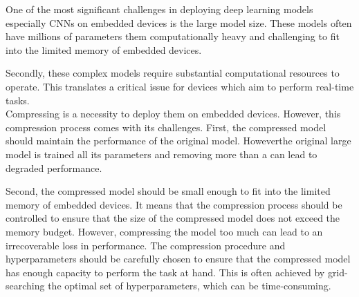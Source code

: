 One of the most significant challenges in deploying deep learning models \DIFdelbegin \DIFdel{,
}\DIFdelend \DIFaddbegin {}\DIFaddend especially \acp{CNN} \DIFdelbegin \DIFdel{, }\DIFdelend on embedded devices \DIFdelbegin \DIFdel{, }\DIFdelend is the large model size. These models
often have millions of parameters \DIFdelbegin {}\DIFdelend \DIFaddbegin {}\DIFaddend them computationally heavy and
challenging to fit into the limited memory of embedded devices. \DIFdelbegin %

\DIFdelend Secondly, these
complex models require substantial computational resources to operate. This
translates \DIFdelbegin {}\DIFdelend \DIFaddbegin {}\DIFaddend a critical issue for devices which
aim to perform real-time tasks.\\

Compressing \DIFdelbegin {}\DIFdelend \DIFaddbegin {}\DIFaddend is a necessity to deploy them on embedded
devices. However, this compression process comes with its \DIFdelbegin {}\DIFdelend challenges. First, the
compressed model should maintain the performance of the original model. However\DIFaddbegin \DIFadd{,
}\DIFaddend the original large model is trained \DIFdelbegin {}\DIFdelend \DIFaddbegin {}\DIFaddend all its parameters and \DIFaddbegin {}\DIFaddend removing more than a \DIFdelbegin {}\DIFdelend \DIFaddbegin {}\DIFaddend can lead to degraded
performance. \DIFaddbegin \\
\DIFaddend 

Second, the compressed model should be small enough to fit into the
limited memory of embedded devices. It means that the compression process should
be controlled to ensure that the size of the compressed model does not exceed
the memory budget. However, compressing the model too much can lead to an
irrecoverable loss in performance. The compression procedure and hyperparameters
should be carefully chosen to ensure that the compressed model has enough
capacity to perform the task at hand. This is often achieved by grid-searching
the optimal set of hyperparameters, which can be time-consuming.\\

